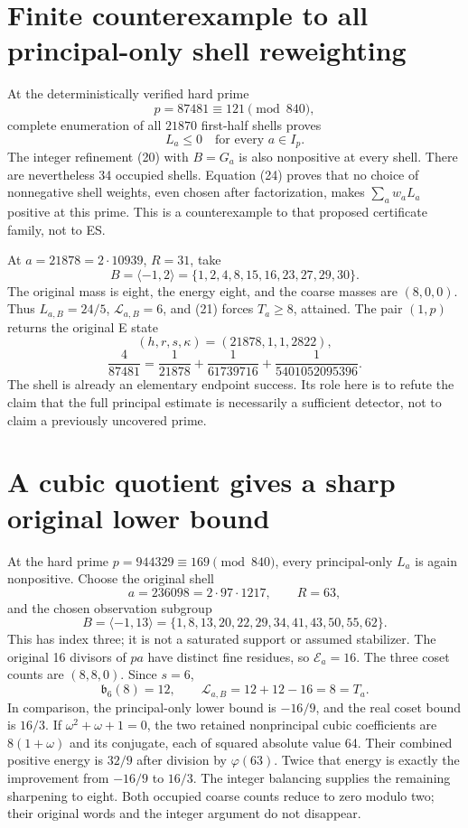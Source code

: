 \section{Finite counterexample to all principal-only shell reweighting}
At the deterministically verified hard prime
\[
 p=87481\equiv121\pmod{840},
\]
complete enumeration of all $21870$ first-half shells proves
\[
 \boxed{L_a\le0\quad\text{for every }a\in I_p.}           \tag{24}
\]
The integer refinement (20) with $B=G_a$ is also nonpositive at every shell.
There are nevertheless 34 occupied shells. Equation (24) proves that no choice
of nonnegative shell weights, even chosen after factorization, makes
$\sum_aw_aL_a$ positive at this prime. This is a counterexample to that proposed
certificate family, not to ES.

At $a=21878=2\cdot10939$, $R=31$, take
\[
 B=\langle-1,2\rangle=\{1,2,4,8,15,16,23,27,29,30\}.
\]
The original mass is eight, the energy eight, and the coarse masses are $(8,0,0)$.
Thus $L_{a,B}=24/5$, $\mathcal L_{a,B}=6$, and (21) forces $T_a\ge8$, attained.
The pair $(1,p)$ returns the original E state
\[
 (h,r,s,\kappa)=(21878,1,1,2822),
\]
\[
 \frac4{87481}=\frac1{21878}+\frac1{61739716}+\frac1{5401052095396}.
\]
The shell is already an elementary endpoint success. Its role here is to refute
the claim that the full principal estimate is necessarily a sufficient detector,
not to claim a previously uncovered prime.

\section{A cubic quotient gives a sharp original lower bound}
At the hard prime $p=944329\equiv169\pmod{840}$, every principal-only $L_a$ is
again nonpositive. Choose the original shell
\[
 a=236098=2\cdot97\cdot1217,\qquad R=63,
\]
and the chosen observation subgroup
\[
 B=\langle-1,13\rangle
 =\{1,8,13,20,22,29,34,41,43, 50,55,62\}.
\]
This has index three; it is not a saturated support or assumed stabilizer.
The original 16 divisors of $pa$ have distinct fine residues, so
$\mathcal E_a=16$. The three coset counts are $(8,8,0)$. Since $s=6$,
\[
 \mathfrak b_6(8)=12,\qquad
 \boxed{\mathcal L_{a,B}=12+12-16=8=T_a.}                  \tag{25}
\]
In comparison, the principal-only lower bound is $-16/9$, and the real
coset bound is $16/3$. If $\omega^2+\omega+1=0$, the two retained nonprincipal
cubic coefficients are $8(1+\omega)$ and its conjugate, each of squared
absolute value 64. Their combined positive energy is $32/9$ after division by
$\varphi(63)$. Twice that energy is exactly the improvement from $-16/9$ to
$16/3$. The integer balancing supplies the remaining sharpening to eight.
Both occupied coarse counts reduce to zero modulo two; their original words
and the integer argument do not disappear.

